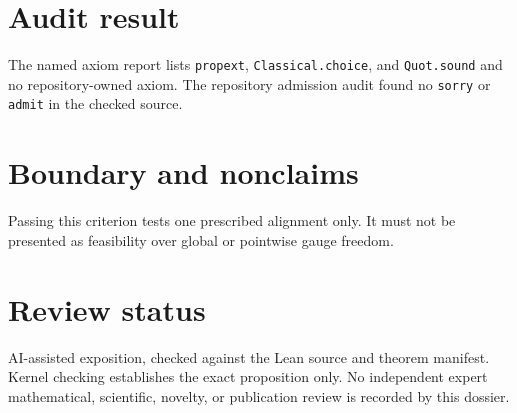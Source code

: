 \documentclass[11pt]{article}
\begin{document}
\section{Audit result}
The named axiom report lists \texttt{propext}, \texttt{Classical.choice}, and
\texttt{Quot.sound} and no repository-owned axiom.  The repository admission audit found no
\texttt{sorry} or \texttt{admit} in the checked source.

\section{Boundary and nonclaims}
Passing this criterion tests one prescribed alignment only.  It must not be presented as feasibility over global or pointwise gauge freedom.

\section{Review status}
AI-assisted exposition, checked against the Lean source and theorem manifest.  Kernel checking
establishes the exact proposition only.  No independent expert mathematical, scientific,
novelty, or publication review is recorded by this dossier.
\end{document}

